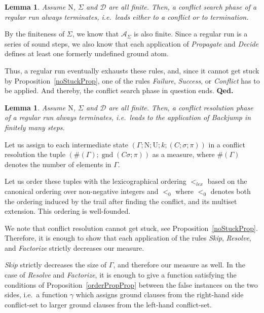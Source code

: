 \documentclass[a4paper]{article}
\newcommand{\mGnd}{\operatorname{gnd}} \newcommand{\mLVar}{\operatorname{lvar}} \newcommand{\mRVar}{\operatorname{rvar}} \newcommand{\mDmn}{\operatorname{dom}} \newcommand{\mRng}{\operatorname{rng}} \newcommand{\mMGU}{\operatorname{mgu}} \newcommand{\mDef}{\operatorname{def}} \newcommand{\mDomain}{\mathcal{D}} \newcommand{\mVar}{\operatorname{var}}
\newcommand{\startproof}{{\bf Proof:~}}
\newcommand{\finishproof}{{\bf Qed.}}
\newtheorem{lemm}[defi]{Lemma}
\begin{document}
\begin{lemm}\label{csTerminatesTheo} Assume $\text{N}$, $\Sigma$ and $\mDomain$ are all finite.
Then, a conflict search phase of a regular run always terminates, i.e.\ 
leads either to a conflict or to termination.
\end{lemm}
\noindent\startproof
By the finiteness of $\Sigma$, we know that $\mathcal{A}_{\Sigma}$ is also finite. 
Since a regular run is a series of sound steps, we also know that each application of \emph{Propagate} and \emph{Decide} 
defines at least one formerly undefined ground atom. 

Thus, a regular run eventually exhausts these rules, and, since it cannot get stuck by Proposition~\ref{noStuckProp}, one of the rules 
\emph{Failure}, \emph{Success}, or \emph{Conflict} has to be applied. And thereby, the conflict search phase in question ends.
\finishproof

\begin{lemm}\label{crTerminatesTheo} Assume $\text{N}$, $\Sigma$ and $\mDomain$ are all finite.
Then, a conflict resolution phase of a regular run always terminates, i.e.\ 
leads to the application of 
\emph{Backjump} in finitely many steps.
\end{lemm}
\noindent\startproof
Let us assign to each intermediate state $(\Gamma; \text{N}; \text{U}; k; (C; \sigma; \pi))$ in a conflict resolution 
the tuple $(\#(\Gamma); \mGnd(C\sigma; \pi))$ as a measure, where $\#(\Gamma)$ denotes 
the number of elements in $\Gamma$. 

Let us order these tuples with the lexicographical ordering $<_{lex}$ based on the canonical ordering over non-negative integers and $<_0$ 
where $<_0$ denotes both the ordering induced by the trail 
after finding the conflict, and its multiset extension. 
This ordering is well-founded.

We note that conflict resolution cannot get stuck, see Proposition~\ref{noStuckProp}. 
Therefore, it is enough to show that each application of the rules \emph{Skip}, \emph{Resolve}, and \emph{Factorize} strictly 
decreases our measure.

\emph{Skip} strictly decreases the size of $\Gamma$, and therefore our measure as well. 
In the case of \emph{Resolve} and \emph{Factorize}, 
it is enough to give a function satisfying the conditions of Proposition~\ref{orderPropProp} 
between the false instances on the two sides, i.e.\ 
a function $\gamma$
which assigns ground clauses from the right-hand side conflict-set to 
larger ground clauses from the left-hand conflict-set.
\end{document}

